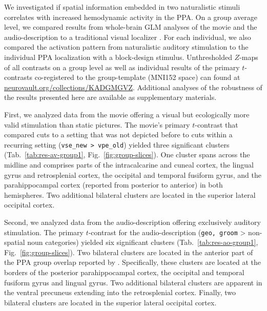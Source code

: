 \documentclass[english]{article}
\begin{document}
We investigated if spatial information embedded in two naturalistic stimuli
correlates with increased hemodynamic activity in the PPA.
On a group average level, we compared results from whole-brain GLM
analyses of the movie and the audio-description to a
traditional visual localizer \citep{sengupta2016extension}.
For each individual, we also compared the activation pattern from
naturalistic auditory stimulation to the individual PPA localization
with a block-design stimulus.
Unthresholded $Z$-maps of all contrasts on a group level as well as individual
results of the primary $t$-contrasts co-registered to the group-template (MNI152
space) can found at
\href{https://neurovault.org/collections/KADGMGVZ/}{\url{neurovault.org/collections/KADGMGVZ}}.
Additional analyses of the robustness of the results presented here
are available as supplementary materials.

First, we analyzed data from the movie offering a visual but ecologically more
valid stimulation than static pictures.
The movie's primary $t$-contrast that compared cuts to a setting that was not
depicted before to cuts within a recurring setting (\texttt{vse\_new >
vpe\_old}) yielded three significant clusters (Tab.~\ref{tab:res-av-group1},
Fig.~\ref{fig:group-slices}).
One cluster spans across the midline and comprises parts of the intracalcarine
and cuneal cortex, the lingual gyrus and retrosplenial cortex, the occipital and
temporal fusiform gyrus, and the parahippocampal cortex (reported from posterior
to anterior) in both hemispheres.
Two additional bilateral clusters are located in the superior lateral occipital
cortex.

Second, we analyzed data from the audio-description offering exclusively
auditory stimulation.
The primary $t$-contrast for the audio-description (\texttt{geo, groom} >
non-spatial noun categories) yielded six significant clusters
(Tab.~\ref{tab:res-ao-group1}, Fig.~\ref{fig:group-slices}).
Two bilateral clusters are located in the anterior part of the PPA group
overlap reported by \cite{sengupta2016extension}.
Specifically, these clusters are located at the borders of the posterior
parahippocampal cortex, the occipital and temporal fusiform gyrus and lingual
gyrus.
Two additional bilateral clusters are apparent in the ventral precuneus
extending into the retrosplenial cortex.
Finally, two bilateral clusters are located in the superior lateral occipital
cortex.
\end{document}
